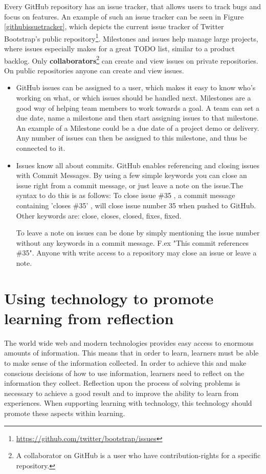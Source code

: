 Every GitHub repository has an issue tracker, that allows users to track bugs and focus on features. An example of such an issue tracker can be seen in Figure \ref{githubissuetracker}, which depicts the current issue tracker of Twitter Bootstrap's public repository\footnote{\url{https://github.com/twitter/bootstrap/issues}}. Milestones and issues help manage large projects, where issues especially makes for a great TODO list, similar to a product backlog. Only {\bf collaborators}\footnote{A collaborator on GitHub is a user who have contribution-rights for a specific repository. } can create and view issues on private repositories. On public repositories anyone can create and view issues. 
\begin{itemize}
\item GitHub issues can be assigned to a user, which makes it easy to know who's working on what, or which issues should be handled next. Milestones are a good way of helping team members to work towards a goal. A team can set a due date, name a milestone and then start assigning issues to that milestone. An example of a Milestone could be a due date of a project demo or delivery. Any number of issues can then be assigned to this milestone, and thus be connected to it. 
\item Issues know all about commits. GitHub enables referencing and closing issues with Commit Messages. By using a few simple keywords you can close an issue right from a commit message, or just leave a note on the issue.The syntax to do this is as follows: To close issue \#35 , a commit message containing 'closes \#35' , will close issue number 35 when pushed to GitHub. Other keywords are: close, closes, closed, fixes, fixed. 

To leave a note on issues can be done by simply mentioning the issue number without any keywords in a commit message. F.ex "This commit references \#35". Anyone with write access to a repository may close an issue or leave a note.
\end{itemize}

\section{Using technology to promote learning from reflection}
The world wide web and modern technologies provides easy access to enormous amounts of information. This means that in order to learn, learners must be able to make sense of the information collected.  
In order to achieve this and make conscious decisions of how to use information, learners need to reflect on the information they collect. Reflection upon the process of solving problems is necessary to achieve a good result and to improve the ability to learn from experiences. When supporting learning with technology, this technology should promote these aspects within learning\citep{Lin1999}. 

